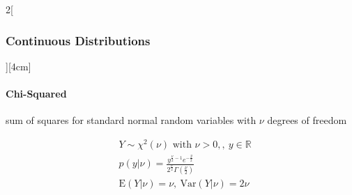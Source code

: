 \documentclass[8pt]{extarticle}
\begin{document}
\begin{multicols}{2}[\subsubsection{Continuous Distributions}][4cm]
  	\paragraph{Chi-Squared} sum of squares for standard normal random variables with $\nu$ degrees of freedom
  
    \begin{align*}
    & Y \sim \chi^2(\nu) \text{ with } \nu > 0,,\: y \in \mathbb{R}\\
    & p(y|\nu) = \frac{y^{\frac{\nu}{2}-1}e^{-\frac{y}{2}}}{2^{\frac{\nu}{2}}\Gamma \left(\frac{\nu}{2}\right)} \\
    & \mathrm{E}(Y|\nu) = \nu, \:
	\mathrm{Var}(Y|\nu) = 2\nu
  \end{align*}

\end{multicols}
\end{document}
